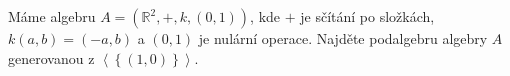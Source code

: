 Máme algebru $A=\left ( \mathbb{R}^{2},+,k,\left ( 0,1 \right ) \right )$, kde
$+$ je sčítání po složkách, $k\left ( a,b \right )=\left ( -a,b \right )$ a
$(0,1)$ je nulární operace. Najděte podalgebru algebry $A$ generovanou z $\left
\langle \left \{ \left ( 1,0 \right ) \right \} \right \rangle$.
